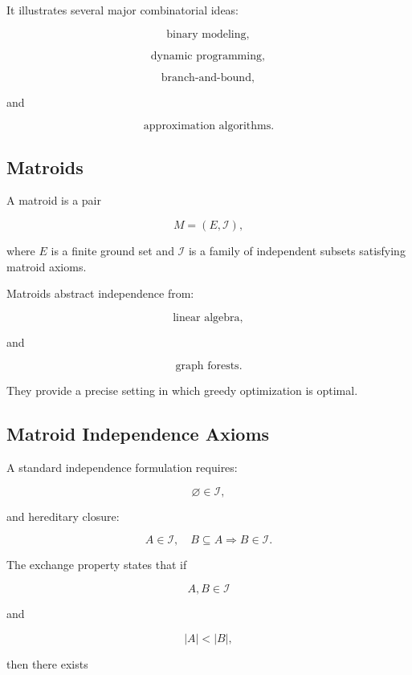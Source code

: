 It illustrates several major combinatorial ideas:

\[
\boxed{
\text{binary modeling},
}
\]

\[
\boxed{
\text{dynamic programming},
}
\]

\[
\boxed{
\text{branch-and-bound},
}
\]

and

\[
\boxed{
\text{approximation algorithms}.
}
\]

\subsection{Matroids}
\label{subsec:matroids-combinatorial-optimization}

A matroid is a pair

\[
\boxed{
M=(E,\mathcal{I}),
}
\]

where \(E\) is a finite ground set and \(\mathcal{I}\) is a family of
independent subsets satisfying matroid axioms.

Matroids abstract independence from:

\[
\boxed{
\text{linear algebra},
}
\]

and

\[
\boxed{
\text{graph forests}.
}
\]

They provide a precise setting in which greedy optimization is optimal.

\subsection{Matroid Independence Axioms}
\label{subsec:matroid-independence-axioms}

A standard independence formulation requires:

\[
\boxed{
\varnothing\in\mathcal{I},
}
\]

and hereditary closure:

\[
\boxed{
A\in\mathcal{I},
\quad
B\subseteq A
\Rightarrow
B\in\mathcal{I}.
}
\]

The exchange property states that if

\[
A,B\in\mathcal{I}
\]

and

\[
|A|<|B|,
\]

then there exists

